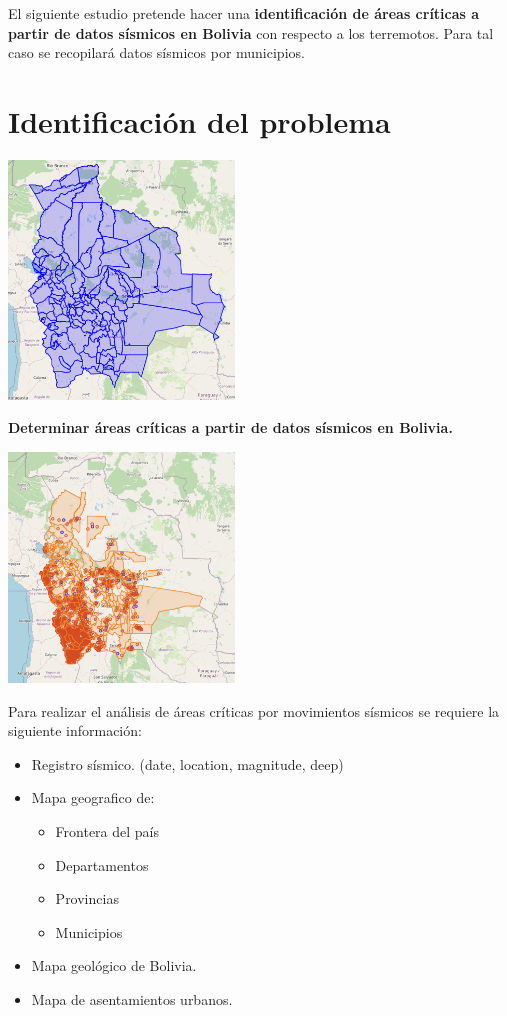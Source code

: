 \documentclass[12pt]{article}
\begin{document}
El siguiente estudio pretende hacer una \textbf{identificación de áreas críticas a partir de datos sísmicos en Bolivia} con respecto a los terremotos. Para tal caso se recopilará datos sísmicos por municipios.


\section{Identificación del problema}

\begin{center}
  \includegraphics[width=6cm]{bolivia_regiones}
\end{center}

\begin{center}
\textbf{Determinar áreas críticas a partir de datos sísmicos en Bolivia.}
\end{center}

\begin{center}
  \includegraphics[width=6cm]{bolivia_eq1}
\end{center}

Para realizar el análisis de áreas críticas por movimientos sísmicos se requiere la siguiente información:

\begin{itemize}
\item Registro sísmico. (date, location, magnitude, deep)
\item Mapa geografico de:
	\begin{itemize}
	\item Frontera del país
	\item Departamentos
	\item Provincias
	\item Municipios
	\end{itemize}
\item Mapa geológico de Bolivia.
\item Mapa de asentamientos urbanos.

\end{itemize}
\end{document}
